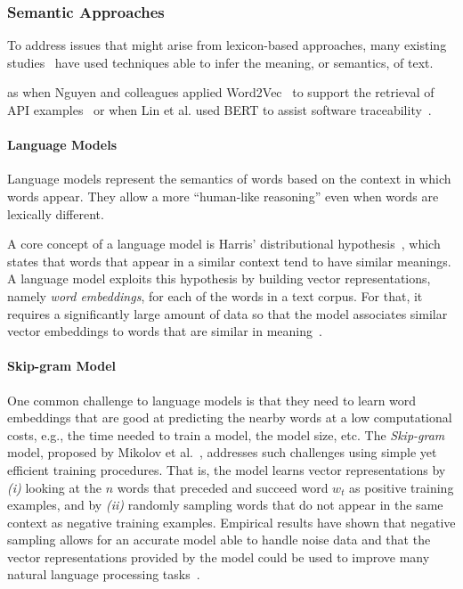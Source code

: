 \subsubsection{Semantic Approaches}



To address issues that might arise from lexicon-based approaches,
many existing studies~\cite{silva2019, Huang2018, Ye2016, huang2018automating} have used techniques able to infer the meaning, or semantics, of text. 



 as  when Nguyen and colleagues
applied Word2Vec~\cite{Mikolov2013} to support the retrieval of API
examples~\cite{nguyen2017} or when Lin et al. used BERT to assist software traceability~\cite{Lin2021}.



\paragraph{\textbf{Language Models}}

Language models represent the semantics of words based on the context in which words appear. They allow a more ``human-like reasoning'' even when words are lexically different. 


A core concept of a language model is Harris' distributional hypothesis~\cite{harris1954distributional}, which states that words that appear in a similar context tend to have similar meanings. A language model exploits this hypothesis by building vector representations, namely \textit{word embeddings}, for each of the words in a text corpus.
For that, it requires a significantly large amount of data so that
the model associates similar vector embeddings to words that are similar in meaning~\cite{Ye2016}. 





\paragraph{\textbf{Skip-gram Model}}
\label{cp5:skip-gram}

One common challenge to language models is that they need to learn word embeddings that are good at predicting the nearby words at a low computational costs, e.g., the time needed to train a model, the model size, etc.
The \textit{Skip-gram} model, proposed by Mikolov et al.~\cite{Mikolov2013}, addresses such challenges using simple yet efficient training procedures. 
That is, the model learns vector representations by \textit{(i)} looking at the $n$ words that preceded and succeed word $w_t$
as positive training examples, and by \textit{(ii)} randomly sampling words that do not appear in the same context as negative training examples. 
Empirical results have shown that negative sampling allows for an accurate model able to handle noise data and that 
the vector representations provided by the model could be used to improve many natural language processing tasks~\cite{mikolov2013efficient}.


